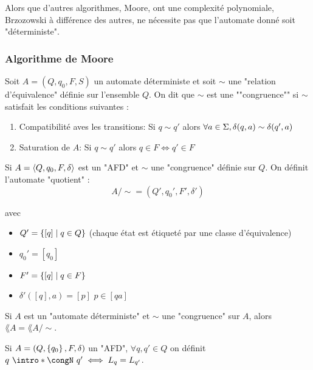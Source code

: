 \begin{remarque}
	Alors que d'autres algorithmes, \tq Moore, ont une complexité polynomiale, Brzozowski à différence des autres, ne nécessite pas
	que l'automate donné soit "déterministe".
\end{remarque}

\subsubsection{Algorithme de Moore}


\begin{definition}
	Soit $A = (Q,q_0,F,S)$ un automate déterministe et soit $\sim$ une "relation d'équivalence" définie sur l'ensemble $Q$. On dit que
	$\sim$ est une ""congruence"" si $\sim$ satisfait les conditions suivantes :
	\begin{enumerate}
		\item Compatibilité aves les transitions: Si $q \sim q'$ alors $\forall a \in \Sigma, \delta (q,a) \sim \delta (q',a)$
		\item Saturation de $A$: Si $q \sim q'$ alors $q \in F \iff q' \in F$
	\end{enumerate}
\end{definition}


\begin{definition}
	Si $A = \langle Q, q_0, F, \delta \rangle$ est un "AFD" et $\sim$ une "congruence" définie sur $Q$. On définit l'automate "quotient" :
	$$ A/\sim = (Q',q_0',F',\delta') $$

	avec \begin{itemize}
		\item $Q' = \left\{[q] \mid q\in Q\right\}$ (chaque état est étiqueté par une classe d'équivalence)
		\item $q_0' = [q_0]$
		\item $F' =\left\{[q] \mid q \in F\right\}$
		\item $\delta'([q], a) = [p]$ \ssi $p \in [qa]$
	\end{itemize}

\end{definition}

\begin{prop}
	Si $A$ est un "automate déterministe" et $\sim$ une "congruence" sur $A$, alors $\lang A = \lang {A/\sim}$.
\end{prop}


\begin{definition}
	Si $A = (Q, \left\{q_0\right\}, F, \delta)$ un "AFD", $\forall q, q' \in Q$ on définit $q \ \intro *\congN \ q' \iff L_q = L_{q'}$.
\end{definition}

